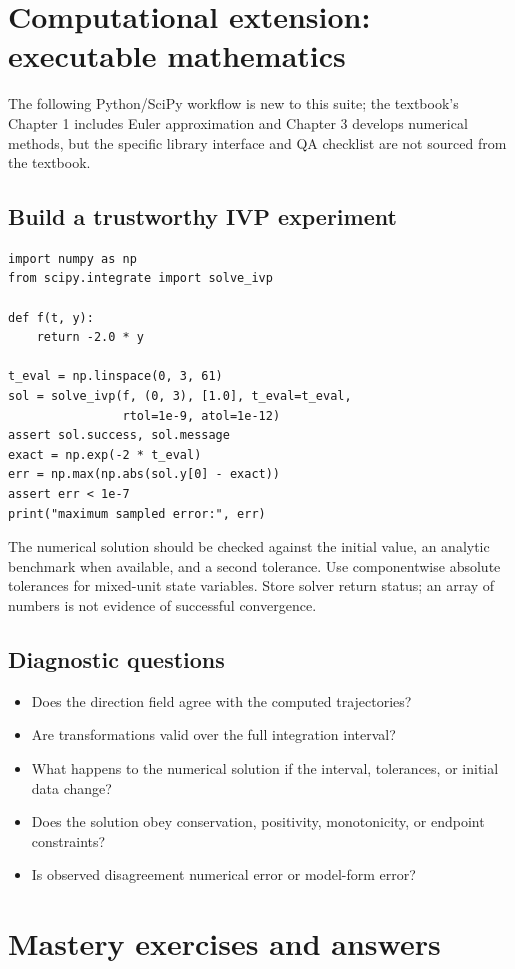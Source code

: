\documentclass[11pt,letterpaper,oneside]{report}
\theoremstyle{definition}\newtheorem{definition}[theorem]{Definition}
\theoremstyle{remark}\newtheorem{remark}[theorem]{Remark}
\begin{document}
\chapter{Computational extension: executable mathematics}
\begin{modern}The following Python/SciPy workflow is new to this suite; the textbook's Chapter 1 includes Euler approximation and Chapter 3 develops numerical methods, but the specific library interface and QA checklist are not sourced from the textbook.\end{modern}
\section{Build a trustworthy IVP experiment}
\begin{lstlisting}
import numpy as np
from scipy.integrate import solve_ivp

def f(t, y):
    return -2.0 * y

t_eval = np.linspace(0, 3, 61)
sol = solve_ivp(f, (0, 3), [1.0], t_eval=t_eval,
                rtol=1e-9, atol=1e-12)
assert sol.success, sol.message
exact = np.exp(-2 * t_eval)
err = np.max(np.abs(sol.y[0] - exact))
assert err < 1e-7
print("maximum sampled error:", err)
\end{lstlisting}
The numerical solution should be checked against the initial value, an analytic benchmark when available, and a second tolerance. Use componentwise absolute tolerances for mixed-unit state variables. Store solver return status; an array of numbers is not evidence of successful convergence.
\section{Diagnostic questions}
\begin{itemize}
\item Does the direction field agree with the computed trajectories?
\item Are transformations valid over the full integration interval?
\item What happens to the numerical solution if the interval, tolerances, or initial data change?
\item Does the solution obey conservation, positivity, monotonicity, or endpoint constraints?
\item Is observed disagreement numerical error or model-form error?
\end{itemize}
\chapter{Mastery exercises and answers}
\end{document}
